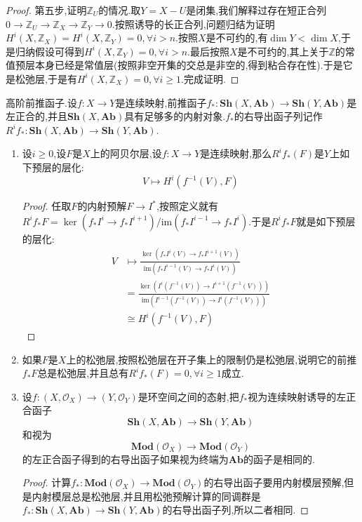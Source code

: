 \begin{enumerate}
\begin{proof}
		\qquad
		
		第五步,证明$\mathbb{Z}_U$的情况.取$Y=X-U$是闭集,我们解释过存在短正合列$0\to\mathbb{Z}_U\to\mathbb{Z}_X\to\mathbb{Z}_Y\to0$.按照诱导的长正合列,问题归结为证明$H^i(X,\mathbb{Z}_X)=H^i(X,\mathbb{Z}_Y)=0,\forall i>n$.按照$X$是不可约的,有$\dim Y<\dim X$,于是归纳假设可得到$H^i(X,\mathbb{Z}_Y)=0,\forall i>n$.最后按照$X$是不可约的,其上关于$\mathbb{Z}$的常值预层本身已经是常值层(按照非空开集的交总是非空的,得到粘合存在性).于是它是松弛层,于是有$H^i(X,\mathbb{Z}_X)=0,\forall i\ge1$.完成证明.
	\end{proof}
\end{enumerate}

高阶前推函子.设$f:X\to Y$是连续映射,前推函子$f_*:\textbf{Sh}(X,\textbf{Ab})\to\textbf{Sh}(Y,\textbf{Ab})$是左正合的,并且$\textbf{Sh}(X,\textbf{Ab})$具有足够多的内射对象.$f_*$的右导出函子列记作$R^if_*:\textbf{Sh}(X,\textbf{Ab})\to\textbf{Sh}(Y,\textbf{Ab})$.
\begin{enumerate}
	\item 设$i\ge0$,设$F$是$X$上的阿贝尔层,设$f:X\to Y$是连续映射,那么$R^if_*(F)$是$Y$上如下预层的层化:
	$$V\mapsto H^i(f^{-1}(V),F)$$
	\begin{proof}
		
		任取$F$的内射预解$F\to I^*$,按照定义就有$R^if_*F=\ker(f_*I^i\to f_*I^{i+1})/\mathrm{im}(f_*I^{i-1}\to f_*I^i)$.于是$R^if_*F$就是如下预层的层化:
		\begin{align*}
			V&\mapsto\frac{\ker\left(f_*I^i(V)\to f_*I^{i+1}(V)\right)}{\mathrm{im}\left(f_*I^{i-1}(V)\to f_*I^i(V)\right)}\\&=\frac{\ker\left(I^i(f^{-1}(V))\to I^{i+1}(f^{-1}(V))\right)}{\mathrm{im}\left(I^{i-1}(f^{-1}(V))\to I^i(f^{-1}(V))\right)}\\&\cong H^i(f^{-1}(V),F)
		\end{align*}
	\end{proof}
	\item 如果$F$是$X$上的松弛层,按照松弛层在开子集上的限制仍是松弛层,说明它的前推$f_*F$总是松弛层,并且总有$R^if_*(F)=0,\forall i\ge1$成立.
	\item 设$f:(X,\mathscr{O}_X)\to(Y,\mathscr{O}_Y)$是环空间之间的态射,把$f_*$视为连续映射诱导的左正合函子$$\textbf{Sh}(X,\textbf{Ab})\to\textbf{Sh}(Y,\textbf{Ab})$$和视为$$\textbf{Mod}(\mathscr{O}_X)\to\textbf{Mod}(\mathscr{O}_Y)$$的左正合函子得到的右导出函子如果视为终端为$\textbf{Ab}$的函子是相同的.
	\begin{proof}
		
		计算$f_*:\textbf{Mod}(\mathscr{O}_X)\to\textbf{Mod}(\mathscr{O}_Y)$的右导出函子要用内射模层预解,但是内射模层总是松弛层,并且用松弛预解计算的同调群是$f_*:\textbf{Sh}(X,\textbf{Ab})\to\textbf{Sh}(Y,\textbf{Ab})$的右导出函子列,所以二者相同.
	\end{proof}
\end{enumerate}

